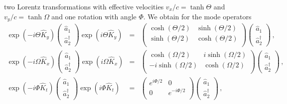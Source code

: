 \documentclass[12pt,amsmath,amssymb]{article}
\numberwithin{equation}{section}
\begin{document}
two Lorentz transformations \cite{LL2} with effective velocities
$v_x/c=\tanh\Theta$ and $v_y/c=\tanh\Omega$
and one rotation with angle $\Phi$.
We obtain for the mode operators
\begin{eqnarray}
\exp(-i\Theta\hat{K}_y) \left(
    \begin{array}{c}
     \hat{a}_1 \\
     \hat{a}_2^\dagger
    \end{array}
\right) \exp(i\Theta\hat{K}_y) &=& \left(
    \begin{array}{cc}
      \cosh(\Theta/2) & \sinh(\Theta/2)\\
      \sinh(\Theta/2) & \cosh(\Theta/2)\\
    \end{array}
\right) \left(
    \begin{array}{c}
     \hat{a}_1 \\
     \hat{a}_2^\dagger
    \end{array}
\right) \,, \nonumber\\
\exp(-i\Omega\hat{K}_x) \left(
    \begin{array}{c}
     \hat{a}_1 \\
     \hat{a}_2^\dagger
    \end{array}
\right) \exp(i\Omega\hat{K}_x) &=& \left(
    \begin{array}{cc}
       \cosh(\Omega/2) & i\sinh(\Omega/2)\\
       -i\sinh(\Omega/2) & \cosh(\Omega/2)\\
    \end{array}
\right) \left(
    \begin{array}{c}
     \hat{a}_1 \\
     \hat{a}_2^\dagger
    \end{array}
\right) \,, \nonumber\\
\exp(-i\Phi\hat{K}_t) \left(
    \begin{array}{c}
     \hat{a}_1 \\
     \hat{a}_2^\dagger
    \end{array}
\right) \exp(i\Phi\hat{K}_t) &=& \left(
    \begin{array}{cc}
      e^{i\Phi/2} & 0\\
      0 & e^{-i\Phi/2}\\
    \end{array}
\right) \left(
    \begin{array}{c}
     \hat{a}_1 \\
     \hat{a}_2^\dagger
    \end{array}
\right) \,,
\label{eq:lorentzmodes}
\end{eqnarray}
\end{document}
